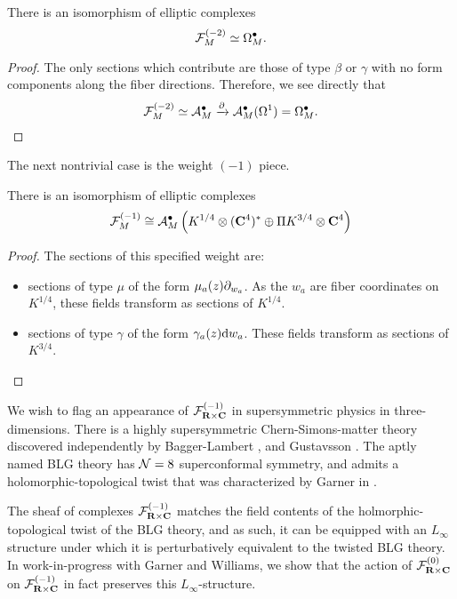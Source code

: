 \documentclass[../main.tex]{subfiles}
\begin{document}
\begin{lem}
There is an isomorphism of elliptic complexes \[\mathcal{F}^{(-2)}_{M} \simeq \Omega^\bullet_{M}.\]
\end{lem}
\begin{proof}
The only sections which contribute are those of type $\beta$ or $\gamma$ with no form components along the fiber directions. Therefore, we see directly that \[\mathcal{F}^{(-2)}_{M} \simeq \mathcal A^\bullet_M \xrightarrow{\partial} \mathcal A^\bullet_M(\Omega^1) = \Omega^\bullet_M.\] 
\end{proof}

\parsec[] The next nontrivial case is the weight ${(-1)}$ piece. 

\begin{lem}
There is an isomorphism of elliptic complexes 
\[ \mathcal{F}^{(-1)}_{M} \cong \mathcal A^\bullet_M \left (K^{1/4}\otimes (\mathbf{C}^4)^* \oplus \Pi K^{3/4}\otimes \mathbf{C}^4 \right ) \]
\end{lem}
\begin{proof}
The sections of this specified weight are:
\begin{itemize}
\item sections of type $\mu$ of the form $\mu_a(z) \partial_{w_a}$. 
As the $w_a$ are fiber coordinates on $K^{1/4}$, these fields transform as sections of $K^{1/4}$.
\item sections of type $\gamma$ of the form $\gamma_a(z) \mathrm{d} w_a$. 
These fields transform as sections of $K^{3/4}$. 
\end{itemize}
\end{proof}

\parsec[]
We wish to flag an appearance of $\mathcal{F}^{(-1)}_{\mathbf{R}\times \mathbf{C}}$ in supersymmetric physics in three-dimensions. There is a highly supersymmetric Chern-Simons-matter theory discovered independently by Bagger-Lambert \cite{Bagger_2007}, \cite{Bagger:2007jr} and Gustavsson \cite{Gustavsson:2007vu}. The aptly named BLG theory has $\mathcal{N}=8$ superconformal symmetry, and admits a holomorphic-topological twist that was characterized by Garner in \cite{Garner2022vds}.

The sheaf of complexes $\mathcal{F}^{(-1)}_{\mathbf{R}\times \mathbf{C}}$ matches the field contents of the holmorphic-topological twist of the BLG theory, and as such, it can be equipped with an $L_\infty$ structure under which it is perturbatively equivalent to the twisted BLG theory. In work-in-progress with Garner and Williams, we show that the action of $\mathcal{F}^{(0)}_{\mathbf{R}\times \mathbf{C}}$ on $\mathcal{F}^{(-1)}_{\mathbf{R}\times \mathbf{C}}$ in fact preserves this $L_\infty$-structure. 
\end{document}
